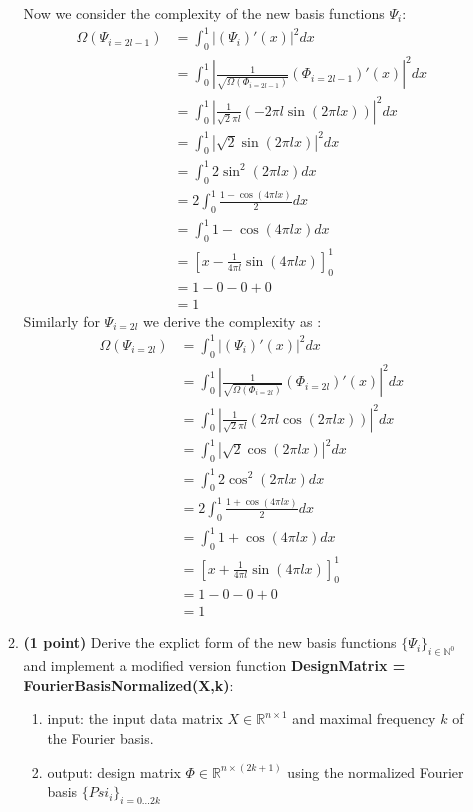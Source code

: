 \documentclass{./tufte-handout}
\begin{document}
\begin{enumerate}[(a)]
\begin{enumerate}
    Now we consider the complexity of the new basis functions $\Psi_i$:
    \begin{align}
            \Omega(\Psi_{i=2l-1}) &= \int_0^1 |(\Psi_i)'(x)|^2 dx \\
             &= \int_0^1 | \frac{1}{\sqrt{\Omega(\Phi_{i=2l-1})}} (\Phi_{i=2l-1})'(x) |^2 dx \\
             &= \int_0^1 | \frac{1}{\sqrt{2} \pi l} (-2 \pi l \sin(2 \pi l x)) |^2 dx \\
             &= \int_0^1 | \sqrt{2} \sin(2 \pi l x) |^2 dx \\
             &= \int_0^1 2 \sin^2(2 \pi l x) dx \\
             &= 2 \int_0^1 \frac{1 - \cos(4 \pi l x)}{2} dx \\
             &= \int_0^1 1 - \cos(4 \pi l x) dx \\
             &= \left[ x - \frac{1}{4 \pi l} \sin(4 \pi l x) \right]_0^1 \\
             &= 1 - 0 - 0 + 0 \\
             &= 1
    \end{align}
    Similarly for $\Psi_{i=2l}$ we derive the complexity as :
    \begin{align}
        \Omega(\Psi_{i=2l}) &= \int_0^1 |(\Psi_i)'(x)|^2 dx \\
             &= \int_0^1 | \frac{1}{\sqrt{\Omega(\Phi_{i=2l})}} (\Phi_{i=2l})'(x) |^2 dx \\
             &= \int_0^1 | \frac{1}{\sqrt{2} \pi l} (2 \pi l \cos(2 \pi l x)) |^2 dx \\
             &= \int_0^1 | \sqrt{2} \cos(2 \pi l x) |^2 dx \\
             &= \int_0^1 2 \cos^2(2 \pi l x) dx \\
             &= 2 \int_0^1 \frac{1 + \cos(4 \pi l x)}{2} dx \\
             &= \int_0^1 1 + \cos(4 \pi l x) dx \\
             &= \left[ x + \frac{1}{4 \pi l} \sin(4 \pi l x) \right]_0^1 \\
             &= 1 - 0 - 0 + 0 \\
             &= 1
    \end{align}
        

    \item \textbf{(1 point)} Derive the explict form of the new basis functions $\{\Psi_i\}_{i \in \mathbb{N}^0}$ and implement a 
    modified version function \textbf{DesignMatrix = FourierBasisNormalized(X,k)}:
    \begin{enumerate}
        \item input: the input data matrix $X \in \mathbb{R}^{n \times 1}$ and maximal frequency $k$ of the Fourier basis.
        \item output: design matrix  $\Phi \in \mathbb{R}^{n \times (2k+1)}$ using the normalized Fourier basis $\{Psi_i\}_{i = 0 \dots 2k}$
    \end{enumerate}


\end{enumerate}
\end{enumerate}
\end{document}
